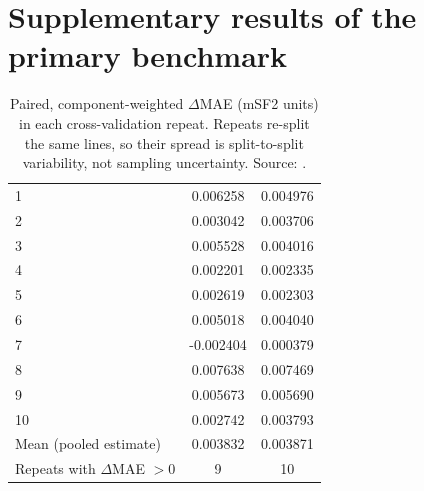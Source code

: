 
\section{Supplementary results of the primary benchmark}\label{app:primary}

\begin{table}[htbp]
  \caption[$\Delta$MAE per cross-validation repeat]{Paired, component-weighted $\Delta$MAE
    (mSF2 units) in each cross-validation repeat. Repeats re-split the same lines, so their
    spread is split-to-split variability, not sampling uncertainty. Source:
    .}
  \label{tab:s1}
  \small
  \begin{tabular}{@{}l S[table-format=-1.6] S[table-format=1.6]@{}}
    \toprule
     & {} & {} \\
     & 0.006258 & 0.004976 \\
    2 & 0.003042 & 0.003706 \\
    3 & 0.005528 & 0.004016 \\
    4 & 0.002201 & 0.002335 \\
    5 & 0.002619 & 0.002303 \\
    6 & 0.005018 & 0.004040 \\
    7 & -0.002404 & 0.000379 \\
    8 & 0.007638 & 0.007469 \\
    9 & 0.005673 & 0.005690 \\
    10 & 0.002742 & 0.003793 \\
    \midrule
    Mean (pooled estimate) & 0.003832 & 0.003871 \\
    Repeats with $\Delta$MAE $>0$ & {9} & {10} \\
    \bottomrule
  \end{tabular}
\end{table}

